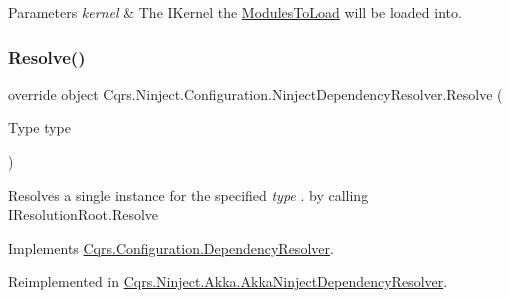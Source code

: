 \begin{DoxyParams}{Parameters}
{\em kernel} & The I\+Kernel the \hyperlink{classCqrs_1_1Ninject_1_1Configuration_1_1NinjectDependencyResolver_a45264a8fae5380727d1af41bc2155381_a45264a8fae5380727d1af41bc2155381}{Modules\+To\+Load} will be loaded into.\\
\hline
\end{DoxyParams}
\mbox{\label{classCqrs_1_1Ninject_1_1Configuration_1_1NinjectDependencyResolver_ab9da7f1556cc1ef205d03d3ff62017c0_ab9da7f1556cc1ef205d03d3ff62017c0}} 
\subsubsection{\texorpdfstring{Resolve()}{Resolve()}}
{\footnotesize\ttfamily override object Cqrs.\+Ninject.\+Configuration.\+Ninject\+Dependency\+Resolver.\+Resolve (\begin{DoxyParamCaption}\item[{Type}]{type }\end{DoxyParamCaption})\hspace{0.3cm}{\ttfamily [virtual]}}



Resolves a single instance for the specified {\itshape type} . by calling I\+Resolution\+Root.\+Resolve 



Implements \hyperlink{classCqrs_1_1Configuration_1_1DependencyResolver_aaeeb3ad2e0ef44bd98469d843210205c_aaeeb3ad2e0ef44bd98469d843210205c}{Cqrs.\+Configuration.\+Dependency\+Resolver}.



Reimplemented in \hyperlink{classCqrs_1_1Ninject_1_1Akka_1_1AkkaNinjectDependencyResolver_adace29de71f10e34e952bd41e48106a6_adace29de71f10e34e952bd41e48106a6}{Cqrs.\+Ninject.\+Akka.\+Akka\+Ninject\+Dependency\+Resolver}.

\mbox{\label{classCqrs_1_1Ninject_1_1Configuration_1_1NinjectDependencyResolver_ab044ba98051bdd3111e0c1be6259de10_ab044ba98051bdd3111e0c1be6259de10}} 
